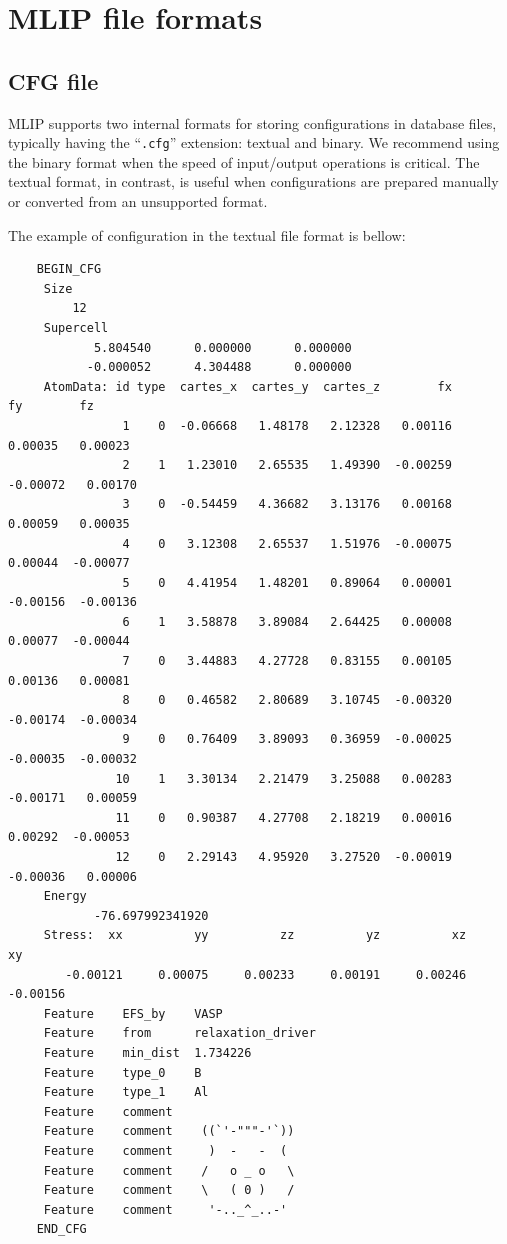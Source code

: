 \documentclass[12pt]{article}
\renewcommand{\_}{\char`_}
\begin{document}
\section{MLIP file formats}

\subsection{CFG file}\label{cfg-file}

MLIP supports two internal formats for storing configurations in database files, typically having the ``\texttt{.cfg}'' extension: textual and binary.
We recommend using the binary format when the speed of input/output operations is critical.
The textual format, in contrast, is useful when configurations are prepared manually or converted from an unsupported format.

The example of configuration in the textual file format is bellow:

{\small
	\begin{verbatim}
	BEGIN_CFG
	 Size
	     12
	 Supercell
	        5.804540      0.000000      0.000000
	       -0.000052      4.304488      0.000000
	 AtomData: id type  cartes_x  cartes_y  cartes_z        fx        fy        fz
	            1    0  -0.06668   1.48178   2.12328   0.00116   0.00035   0.00023
	            2    1   1.23010   2.65535   1.49390  -0.00259  -0.00072   0.00170
	            3    0  -0.54459   4.36682   3.13176   0.00168   0.00059   0.00035
	            4    0   3.12308   2.65537   1.51976  -0.00075   0.00044  -0.00077
	            5    0   4.41954   1.48201   0.89064   0.00001  -0.00156  -0.00136
	            6    1   3.58878   3.89084   2.64425   0.00008   0.00077  -0.00044
	            7    0   3.44883   4.27728   0.83155   0.00105   0.00136   0.00081
	            8    0   0.46582   2.80689   3.10745  -0.00320  -0.00174  -0.00034
	            9    0   0.76409   3.89093   0.36959  -0.00025  -0.00035  -0.00032
	           10    1   3.30134   2.21479   3.25088   0.00283  -0.00171   0.00059
	           11    0   0.90387   4.27708   2.18219   0.00016   0.00292  -0.00053
	           12    0   2.29143   4.95920   3.27520  -0.00019  -0.00036   0.00006
	 Energy
	        -76.697992341920
	 Stress:  xx          yy          zz          yz          xz          xy
	    -0.00121     0.00075     0.00233     0.00191     0.00246    -0.00156
	 Feature    EFS_by    VASP
	 Feature    from      relaxation_driver
	 Feature    min_dist  1.734226
	 Feature    type_0    B
	 Feature    type_1    Al
	 Feature    comment	  
	 Feature    comment	   ((`'-"""-'`))
	 Feature    comment	    )  -   -  (
	 Feature    comment	   /   o _ o   \
	 Feature    comment	   \   ( 0 )   /
	 Feature    comment	    '-.._^_..-' 
	END_CFG
	\end{verbatim}
}
\end{document}
